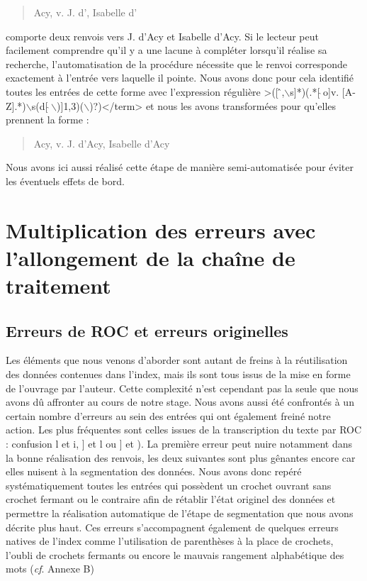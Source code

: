 \documentclass[a4paper,12pt,twoside]{book}
\begin{document}
	\begin{quotation}
		Acy, v. J. d', Isabelle d'
	\end{quotation}

	\noindent comporte deux renvois vers \og J. d'Acy\fg{} et \og Isabelle d'Acy\fg{}. Si le lecteur peut facilement comprendre qu'il y a une lacune à compléter lorsqu'il réalise sa recherche, l'automatisation de la procédure nécessite que le renvoi corresponde exactement à l'entrée vers laquelle il pointe. Nous avons donc pour cela identifié toutes les entrées de cette forme avec l'expression régulière \og >([\,\^\,,$\backslash$s]*)(.*[\,$\hat{}$\,o]v. [A-Z].*)$\backslash$s(d[\,$\hat{}$\,$\backslash$)]{1,3})($\backslash$)?)</term>\fg{} et nous les avons transformées pour qu'elles prennent la forme :
	
	\begin{quotation}
		Acy, v. J. d'Acy, Isabelle d'Acy
	\end{quotation}

	\noindent Nous avons ici aussi réalisé cette étape de manière semi-automatisée pour éviter les éventuels effets de bord.
	
	\section{Multiplication des erreurs avec l’allongement de la chaîne de traitement}
	
	\subsection{Erreurs de ROC et erreurs originelles}
	
	Les éléments que nous venons d'aborder sont autant de freins à la réutilisation des données contenues dans l'index, mais ils sont tous issus de la mise en forme de l'ouvrage par l'auteur. Cette complexité n'est cependant pas la seule que nous avons dû affronter au cours de notre stage. Nous avons aussi été confrontés à un certain nombre d'erreurs au sein des entrées qui ont également freiné notre action. Les plus fréquentes sont celles issues de la transcription du texte par ROC : confusion \og l\fg{} et \og i\fg{}, \og ]\fg{} et \og l\fg{} ou \og ]\fg{} et \og )\fg{}. La première erreur peut nuire notamment dans la bonne réalisation des renvois, les deux suivantes sont plus gênantes encore car elles nuisent à la segmentation des données. Nous avons donc repéré systématiquement toutes les entrées qui possèdent un crochet ouvrant sans crochet fermant ou le contraire afin de rétablir l'état originel des données et permettre la réalisation automatique de l'étape de segmentation que nous avons décrite plus haut. Ces erreurs s'accompagnent également de quelques erreurs natives de l'index comme l'utilisation de parenthèses à la place de crochets, l'oubli de crochets fermants ou encore le mauvais rangement alphabétique des mots (\textit{cf}. Annexe B)
	
\end{document}
